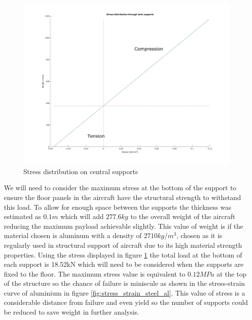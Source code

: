 \begin{figure}[!htbp]
\centering
\includegraphics[width= \linewidth]{../figures/stress_distribution_on_central_supports.jpg}
\caption{Stress distribution on central supports}
  \label{fig:stress_distribution_on_central_supports}
\end{figure}
\FloatBarrier

We will need to consider the maximum stress at the bottom of the support to ensure the floor panels in the aircraft have the structural strength to withstand this load. To allow for enough space between the supports the thickness was estimated as $0.1m$ which will add $277.6kg$ to the overall weight of the aircraft reducing the maximum payload achievable slightly. This value of weight is if the material chosen is aluminum with a density of $2710kg/m^3$, chosen as it is regularly used in structural support of aircraft due to its high material strength properties.
Using the stress displayed in figure \ref{fig:stress_distribution_on_central_supports} the total load at the bottom of each support is 18.52kN which will need to be considered when the supports are fixed to the floor.
The maximum stress value is equivalent to $0.12 MPa$ at the top of the structure so the chance of failure is miniscule as shown in the stress-strain curve of aluminium in figure \ref{fig:stress_strain_steel_al}. This value of stress is a considerable distance from failure and even yield so the number of supports could be reduced to save weight in further analysis. 

